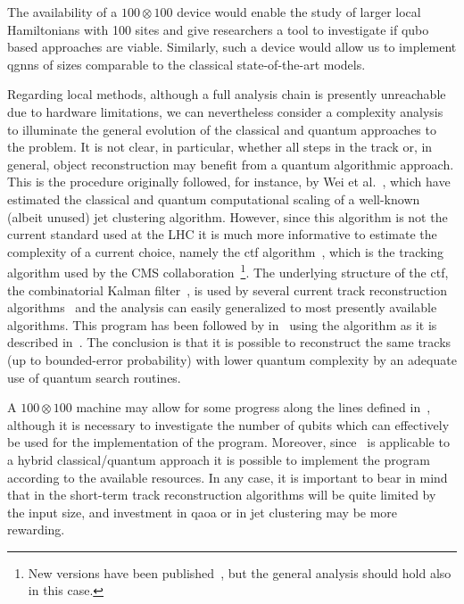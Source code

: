 The availability of a $100 \otimes 100$ device would enable the study of larger local Hamiltonians with 100 sites and give researchers a tool to investigate if \gls{qubo} based approaches are viable. Similarly, such a device would allow us to implement \gls{qgnn}s of sizes comparable to the classical state-of-the-art models. 

Regarding local methods, although a full analysis chain is presently unreachable due to hardware limitations, we can nevertheless consider a complexity analysis to illuminate the general evolution of the classical and quantum approaches to the problem. It is not clear, in particular, whether all steps in the track or, in general, object reconstruction may benefit from a quantum algorithmic approach.
This is the procedure originally followed, for instance, by Wei et al.~\cite{Wei2020}, which have estimated the classical and quantum computational scaling of a well-known (albeit unused) jet clustering algorithm. However, since this algorithm is not the current standard used at the LHC it is much more informative to estimate the complexity of a current choice, namely the \gls{ctf} algorithm~\cite{JINST}, which is the tracking algorithm used by the CMS collaboration~\footnote{New versions have been published~\cite{Bocci2020}, but the general analysis should hold also in this case.}. The underlying structure of the \gls{ctf}, the combinatorial Kalman filter~\cite{KalmanFilterFruhwirth}, is used by several current track reconstruction algorithms~\cite{Sguazzoni2016,ATLAS,Braun2018} and the analysis can easily generalized to most presently available algorithms. This program has been followed by in~\cite{Magano:2021jzd} using the algorithm as it is described in~\cite{JINST}. The conclusion is that it is possible to reconstruct the same tracks (up to bounded-error probability) with lower quantum complexity by an adequate use of quantum search routines.

A $100 \otimes 100$ machine may allow for some progress along the lines defined in~\cite{Magano:2021jzd}, although it is necessary to investigate the number of qubits which can effectively be used for the implementation of the program. Moreover, since~\cite{Magano:2021jzd} is applicable to a hybrid classical/quantum approach it is possible to implement the program according to the available resources. In any case, it is important to bear in mind that in the short-term track reconstruction algorithms will be quite limited by the input size, and investment in \gls{qaoa} or in jet clustering may be more rewarding. 


